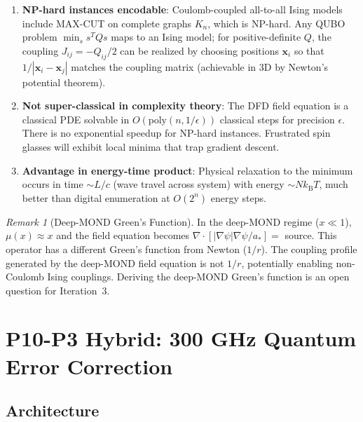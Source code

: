 \documentclass[11pt]{article}
\theoremstyle{definition}
\theoremstyle{remark}
\newtheorem{remark}[theorem]{Remark}
\newcommand{\kB}{k_{\mathrm{B}}}
\begin{document}
\begin{enumerate}
\item \textbf{NP-hard instances encodable}: Coulomb-coupled all-to-all
  Ising models include MAX-CUT on complete graphs $K_n$, which is NP-hard.
  Any QUBO problem $\min_s s^T Q s$ maps to an Ising model; for
  positive-definite $Q$, the coupling $J_{ij} = -Q_{ij}/2$ can be
  realized by choosing positions $\mathbf{x}_i$ so that
  $1/|\mathbf{x}_i - \mathbf{x}_j|$ matches the coupling matrix
  (achievable in 3D by Newton's potential theorem).

\item \textbf{Not super-classical in complexity theory}: The DFD field
  equation is a classical PDE solvable in $O(\mathrm{poly}(n, 1/\epsilon))$
  classical steps for precision $\epsilon$. There is no exponential
  speedup for NP-hard instances. Frustrated spin glasses will exhibit
  local minima that trap gradient descent.

\item \textbf{Advantage in energy-time product}: Physical relaxation to
  the minimum occurs in time $\sim L/c$ (wave travel across system)
  with energy $\sim N\kB T$, much better than digital enumeration at
  $O(2^n)$ energy steps.
\end{enumerate}

\begin{remark}[Deep-MOND Green's Function]
In the deep-MOND regime ($x \ll 1$), $\mu(x) \approx x$ and the field
equation becomes $\nabla\cdot[|\nabla\psi|\nabla\psi/a_*] = $ source.
This operator has a different Green's function from Newton ($1/r$). The
coupling profile generated by the deep-MOND field equation is not $1/r$,
potentially enabling non-Coulomb Ising couplings. Deriving the deep-MOND
Green's function is an open question for Iteration~3.
\end{remark}

\section{P10-P3 Hybrid: 300 GHz Quantum Error Correction}
\label{sec:hybrid_qec}

\subsection{Architecture}
\end{document}
